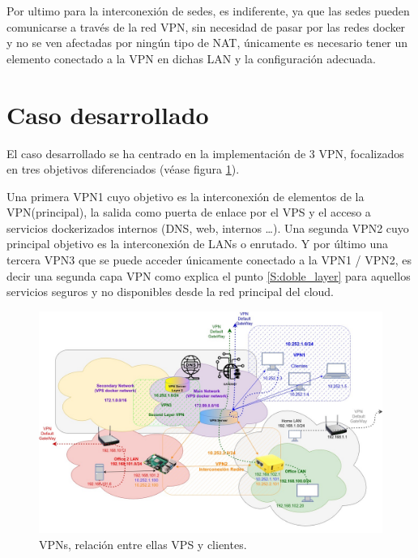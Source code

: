 Por ultimo para la interconexión de sedes, es indiferente, ya que las sedes pueden comunicarse a través de la red VPN, sin necesidad de pasar por las redes docker y no se ven afectadas por ningún tipo de NAT, únicamente es necesario tener un elemento conectado a la VPN en dichas LAN y la configuración adecuada.

\section{Caso desarrollado}
El caso desarrollado se ha centrado en la implementación de 3 VPN, focalizados en tres objetivos diferenciados (véase figura \ref{F:red_entorno_vpn}). 

Una primera VPN1 cuyo objetivo es la interconexión de elementos de la VPN(principal), la salida como puerta de enlace por el VPS y el acceso a servicios dockerizados internos (DNS, web, internos …). Una segunda VPN2 cuyo principal objetivo es la interconexión de LANs o enrutado. Y por último una tercera VPN3 que se puede acceder únicamente conectado a la VPN1 / VPN2, es decir una segunda capa VPN como explica el punto \ref{S:doble_layer} para aquellos servicios seguros y no disponibles desde la red principal del cloud.

\begin{figure}[!htb]
\begin{center}
\includegraphics[width=1\textwidth]{./figuras/red_entorno_vpn}
\caption{VPNs, relación entre ellas VPS y clientes.}
\label{F:red_entorno_vpn}
\end{center}
\end{figure}

